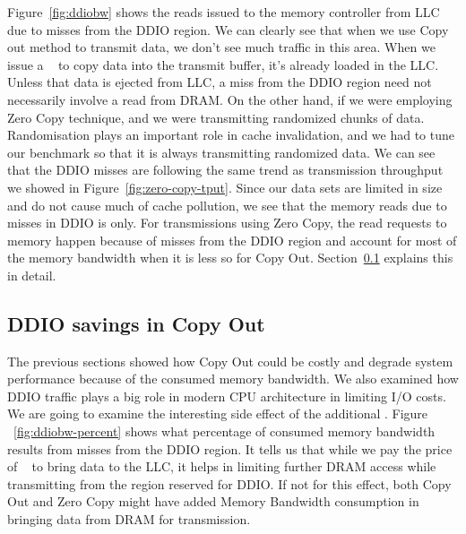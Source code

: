 Figure~\ref{fig:ddiobw} shows the reads issued to the memory controller from LLC due to misses from the  DDIO region. We can clearly see that when we use Copy out 
method to transmit data, we don't see much traffic in this area. When we issue a \memcpy~ to copy data into the transmit buffer, it's already loaded in the LLC. 
Unless that data is ejected from LLC, a miss from the DDIO region need not necessarily involve a read from DRAM. On the other hand, if we were employing Zero Copy technique, 
and we were transmitting randomized chunks of data. Randomisation plays an important role in cache invalidation,
 and we had to tune our benchmark so that it is always transmitting randomized data. 
We can see that the DDIO misses are following the same trend as transmission throughput we showed in Figure~\ref{fig:zero-copy-tput}. 
Since our data sets are limited in size and do not cause much of cache pollution, we see that the 
memory reads due to misses in DDIO is only. For transmissions using Zero Copy, 
the read requests to memory happen because of misses from the DDIO region and account for 
most of the memory bandwidth when it is less so for Copy Out. Section~\ref{sec:ddiobw-savings} explains this in detail.
\newline




\subsection{DDIO savings in Copy Out}
\label{sec:ddiobw-savings}
The previous sections showed how Copy Out could be costly and degrade system performance 
because of the consumed memory bandwidth. We also examined how DDIO traffic plays a big role 
in modern CPU architecture in limiting I/O costs. We are going to examine the 
interesting side effect of the additional \memcpy. Figure ~\ref{fig:ddiobw-percent} shows what percentage of consumed 
memory bandwidth results from misses from the DDIO region. It tells us that while 
we pay the price of \memcpy~ to bring data to the LLC, it helps in limiting further DRAM access while transmitting 
from the region reserved for DDIO. If not for this effect, both Copy Out and Zero Copy 
might have added Memory Bandwidth consumption in bringing data from DRAM for transmission. 



